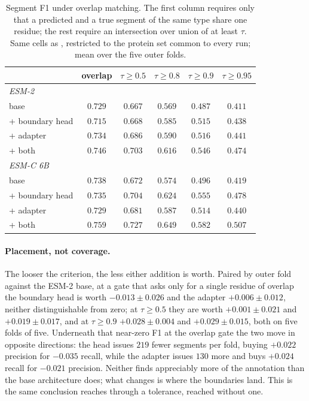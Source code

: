 \documentclass{article}
\begin{document}
\begin{table}[h]
\centering
\caption{Segment F1 under overlap matching. The first column requires only that a predicted and a
true segment of the same type share one residue; the rest require an intersection over union of at
least $\tau$. Same cells as , restricted to the protein set common to every
run; mean over the five outer folds.}
\label{tab:iou}
\small
\begin{tabular}{lccccc}
\toprule
& overlap & $\tau\ge0.5$ & $\tau\ge0.8$ & $\tau\ge0.9$ & $\tau\ge0.95$ \\
\midrule
\multicolumn{6}{l}{\emph{ESM-2}}\\
base & $0.729$ & $0.667$ & $0.569$ & $0.487$ & $0.411$ \\
\quad + boundary head & $0.715$ & $0.668$ & $0.585$ & $0.515$ & $0.438$ \\
\quad + adapter & $0.734$ & $0.686$ & $0.590$ & $0.516$ & $0.441$ \\
\quad + both & $0.746$ & $0.703$ & $0.616$ & $0.546$ & $0.474$ \\
\midrule
\multicolumn{6}{l}{\emph{ESM-C 6B}}\\
base & $0.738$ & $0.672$ & $0.574$ & $0.496$ & $0.419$ \\
\quad + boundary head & $0.735$ & $0.704$ & $0.624$ & $0.555$ & $0.478$ \\
\quad + adapter & $0.729$ & $0.681$ & $0.587$ & $0.514$ & $0.440$ \\
\quad + both & $0.759$ & $0.727$ & $0.649$ & $0.582$ & $0.507$ \\
\bottomrule
\end{tabular}
\end{table}

\paragraph{Placement, not coverage.} The looser the criterion, the less either addition is worth.
Paired by outer fold against the ESM-2 base, at a gate that asks only for a single residue of
overlap the boundary head is worth $-0.013\pm0.026$ and the adapter $+0.006\pm0.012$, neither
distinguishable from zero; at $\tau\ge0.5$ they are worth $+0.001\pm0.021$ and $+0.019\pm0.017$,
and at $\tau\ge0.9$ $+0.028\pm0.004$ and $+0.029\pm0.015$, both on five folds of five. Underneath
that near-zero F1 at the overlap gate the two move in opposite directions: the head issues $219$
fewer segments per fold, buying $+0.022$ precision for $-0.035$ recall, while the adapter issues
$130$ more and buys $+0.024$ recall for $-0.021$ precision. Neither finds appreciably more of the
annotation than the base architecture does; what changes is where the boundaries land. This is the
same conclusion  reaches through a tolerance, reached without one.
\end{document}
